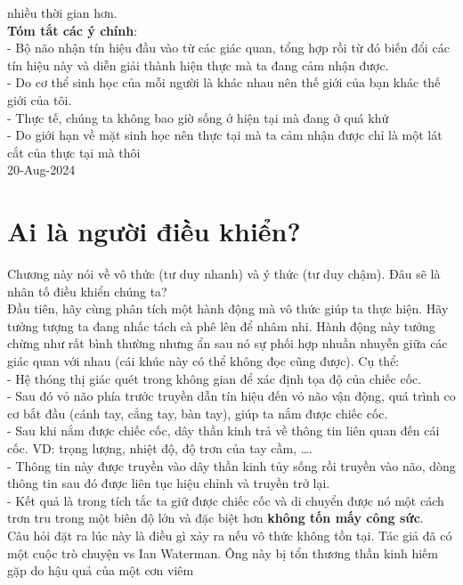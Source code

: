 \documentclass{article}
\newcommand\tab[1][1cm]{\hspace*{#1}}
\begin{document}
 nhiều thời gian hơn.\\
 \tab \textbf{Tóm tắt các ý chính}: \\
\tab\tab - Bộ não nhận tín hiệu đầu vào từ các giác quan, tổng hợp rồi từ đó biến đổi các tín hiệu này 
và diễn giải thành hiện thực mà ta đang cảm nhận được.\\
\tab\tab - Do cơ thể sinh học của mỗi người là khác nhau nên thế giới của bạn khác thế giới của tôi.\\
\tab\tab - Thực tế, chúng ta không bao giờ sống ở hiện tại mà đang ở quá khứ\\
\tab\tab - Do giới hạn về mặt sinh học nên thực tại mà ta cảm nhận được chỉ là một
lát cắt của thực tại mà thôi\\

20-Aug-2024
\section{Ai là người điều khiển?}
\tab Chương này nói về vô thức (tư duy nhanh) và ý thức (tư duy chậm). Đâu sẽ là nhân tố 
điều khiển chúng ta? \\
\tab Đầu tiên, hãy cùng phân tích một hành động mà vô thức giúp ta thực hiện. Hãy tưởng tượng
ta đang nhấc tách cà phê lên để nhâm nhi. Hành động này tưởng chừng như rất bình thường nhưng 
ẩn sau nó sự phối hợp nhuần nhuyễn giữa các giác quan với nhau (cái khúc này có thể không đọc
cũng được). Cụ thể:\\
\tab - Hệ thóng thị giác quét trong không gian để xác định tọa độ của chiếc cốc.\\
\tab - Sau đó vỏ não phía trước truyền dẫn tín hiệu đến vỏ não vận động, quá trình co cơ 
bắt đầu (cánh tay, cẳng tay, bàn tay), giúp ta nắm được chiếc cốc.\\
\tab - Sau khi nắm được chiếc cốc, dây thần kinh trả về thông tin liên quan đến cái cốc. VD: 
trọng lượng, nhiệt độ, độ trơn của tay cầm, \dots.\\
\tab - Thông tin này được truyền vào dây thần kinh tủy sống rồi truyền vào não, dòng thông tin 
sau đó được liên tục hiệu chỉnh và truyền trở lại.\\
\tab - Kết quả là trong tích tắc ta giữ được chiếc cốc và di chuyển được nó một cách trơn tru
trong một biên độ lớn và đặc biệt hơn \textbf{không tốn mấy công sức}.\\
\tab Câu hỏi đặt ra lúc này là điều gì xảy ra nếu vô thức không tồn tại. Tác giả đã có một cuộc
trò chuyện vs Ian Waterman. Ông này bị tổn thương thần kinh hiếm gặp do hậu quả của một cơn viêm
\end{document}
